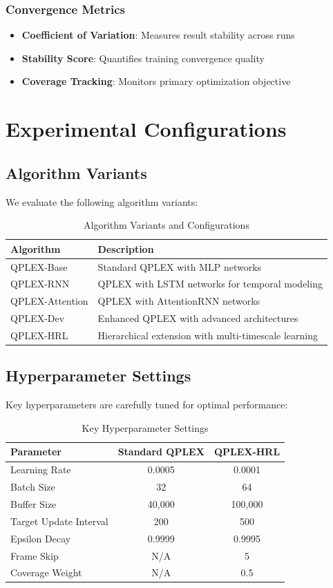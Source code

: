 \documentclass[12pt,a4paper]{report}
\begin{document}
\subsubsection{Convergence Metrics}
\begin{itemize}
\item \textbf{Coefficient of Variation}: Measures result stability across runs
\item \textbf{Stability Score}: Quantifies training convergence quality
\item \textbf{Coverage Tracking}: Monitors primary optimization objective
\end{itemize}

\section{Experimental Configurations}

\subsection{Algorithm Variants}
We evaluate the following algorithm variants:

\begin{table}[H]
\centering
\caption{Algorithm Variants and Configurations}
\begin{tabular}{lp{8cm}}
\toprule
Algorithm & Description \\
\midrule
QPLEX-Base & Standard QPLEX with MLP networks \\
QPLEX-RNN & QPLEX with LSTM networks for temporal modeling \\
QPLEX-Attention & QPLEX with AttentionRNN networks \\
QPLEX-Dev & Enhanced QPLEX with advanced architectures \\
QPLEX-HRL & Hierarchical extension with multi-timescale learning \\
\bottomrule
\end{tabular}
\end{table}

\subsection{Hyperparameter Settings}
Key hyperparameters are carefully tuned for optimal performance:

\begin{table}[H]
\centering
\caption{Key Hyperparameter Settings}
\begin{tabular}{lcc}
\toprule
Parameter & Standard QPLEX & QPLEX-HRL \\
\midrule
Learning Rate & 0.0005 & 0.0001 \\
Batch Size & 32 & 64 \\
Buffer Size & 40,000 & 100,000 \\
Target Update Interval & 200 & 500 \\
Epsilon Decay & 0.9999 & 0.9995 \\
Frame Skip & N/A & 5 \\
Coverage Weight & N/A & 0.5 \\
\bottomrule
\end{tabular}
\end{table}
\end{document}
